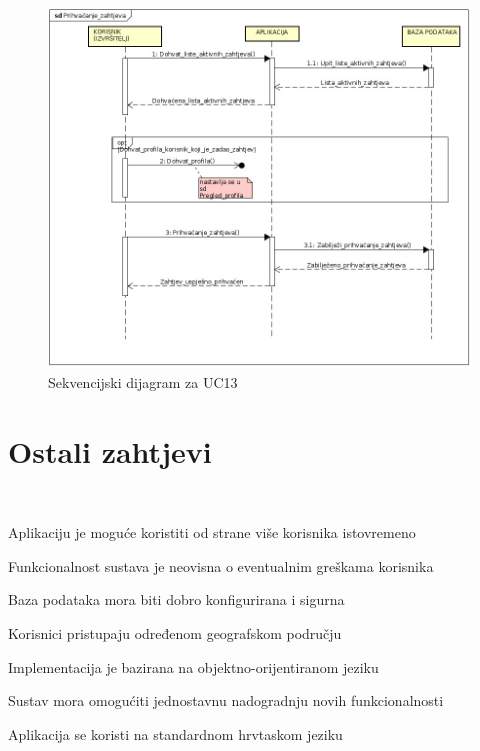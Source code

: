 \newpage
{}
\newline {}\\
\begin{figure}[H]
	\includegraphics[scale=0.48]{slike/sekvencijski_dijagram_prihavcanje_zahtjeva.jpeg} %
	\centering
	\caption {Sekvencijski dijagram za UC13}
	\label{fig:promjene}
\end{figure}

\newpage
\section{Ostali zahtjevi}


\
\begin{packed_item}
	\item Aplikaciju je moguće koristiti od strane više korisnika istovremeno
	\item Funkcionalnost sustava je neovisna o eventualnim greškama korisnika
	\item Baza podataka mora biti dobro konfigurirana i sigurna
	\item Korisnici pristupaju određenom geografskom području
	\item Implementacija je bazirana na objektno-orijentiranom jeziku
	\item Sustav mora omogućiti jednostavnu nadogradnju novih funkcionalnosti
	\item Aplikacija se koristi na standardnom hrvtaskom jeziku

\end{packed_item}
